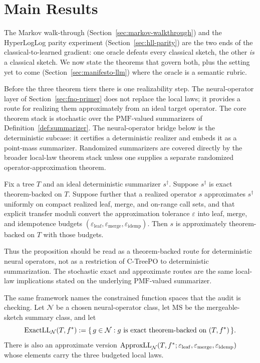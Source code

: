 \section{Main Results}\label{sec:theorems}

The Markov walk-through (Section~\ref{sec:markov-walkthrough}) and the
HyperLogLog parity experiment (Section~\ref{sec:hll-parity}) are the two
ends of the classical-to-learned gradient: one oracle defeats every
classical sketch, the other \emph{is} a classical sketch. We now state
the theorems that govern both, plus the setting yet to come
(Section~\ref{sec:manifesto-llm}) where the oracle is a semantic rubric.

Before the three theorem tiers there is one realizability step. The
neural-operator layer of Section~\ref{sec:fno-primer} does not replace
the local laws; it provides a route for realizing them approximately
from an ideal target operator. The core theorem stack is stochastic
over the $\mathrm{PMF}$-valued summarizers of Definition~\ref{def:summarizer}.
The neural-operator bridge below is the deterministic subcase: it
certifies a deterministic realizer and embeds it as a point-mass
summarizer. Randomized summarizers are covered directly by the broader
local-law theorem stack unless one supplies a separate randomized
operator-approximation theorem.

\begin{proposition}\label{prop:neural-operator-bridge}
Fix a tree $T$ and an ideal deterministic summarizer $s^\dagger$.
Suppose $s^\dagger$ is exact theorem-backed on $T$. Suppose further that
a realized operator $s$ approximates $s^\dagger$ uniformly on compact
realized leaf, merge, and on-range call sets, and that explicit
transfer moduli convert the approximation tolerance $\varepsilon$ into
leaf, merge, and idempotence budgets
$(\varepsilon_{\mathrm{leaf}}, \varepsilon_{\mathrm{merge}},
\varepsilon_{\mathrm{idemp}})$. Then $s$ is approximately
theorem-backed on $T$ with those budgets.
\end{proposition}

Thus the proposition should be read as a theorem-backed route for
deterministic neural operators, not as a restriction of C-TreePO to
deterministic summarization. The stochastic exact and approximate
routes are the same local-law implications stated on the underlying
$\mathrm{PMF}$-valued summarizer.

The same framework names the constrained function spaces that the
audit is checking. Let $\mathcal{N}$ be a chosen neural-operator class,
let $\mathrm{MS}$ be the mergeable-sketch summary class, and let
\[
\mathrm{ExactLL}_{\mathcal{N}}(T,f^\ast)
  := \{\,g\in\mathcal{N}: g \text{ is exact theorem-backed on }(T,f^\ast)\,\}.
\]
There is also an approximate version
$\mathrm{ApproxLL}_{\mathcal{N}}(T,f^\ast;\varepsilon_{\mathrm{leaf}},
\varepsilon_{\mathrm{merge}},\varepsilon_{\mathrm{idemp}})$ whose elements carry
the three budgeted local laws.

